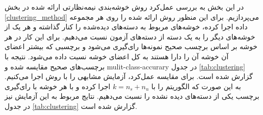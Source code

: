 در این بخش به بررسی عمل‌کرد روش خوشه‌بندی نیمه‌نظارتی ارائه شده در بخش \ref{clustering_method} می‌پردازیم. برای این منظور روش ارائه شده را روی هر مجموعه داده اجرا کرده، خوشه‌های مربوط به دسته‌های دیده‌شده را کنار گذاشته  و هر یک از خوشه‌های دیگر را به یک دسته از دسته‌های آزمون نسبت می‌دهیم. برای این کار در هر خوشه بر اساس برچسب صحیح نمونه‌ها رای‌گیری می‌شود و برچسبی که بیشتر اعضای آن خوشه آن را دارا هستند به کل اعضای خوشه نسبت داده می‌شود. نتیجه با برچسب‌های صحیح مقایسه شده و \gls{mulit-class-accurary} در جدول \ref{tab:clustering} گزارش شده است.
 برای مقایسه عمل‌کرد، آزمایش مشابهی را با روش  اجرا می‌کنیم. به این صورت که  الگوریتم  را با $k=n_s + n_u$ اجرا کرده و با هر خوشه با رای‌گیری برچسب یکی از دسته‌های دیده نشده را نسبت می‌دهیم. نتایج مربوط به این آزمایش نیز در جدول \ref{tab:clustering} گزارش شده است.

